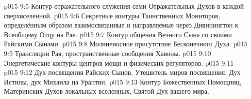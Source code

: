 \vs p015 9:5 Контур отражательного служения семи Отражательных Духов в каждой сверхвселенной.
\vs p015 9:6 Секретные контуры Таинственных Мониторов, определённым образом взаимосвязанные и направляемые через Дивинингтон к Всеобщему Отцу на Рае.
\vs p015 9:7 Контур общения Вечного Сына со своими Райскими Сынами.
\vs p015 9:8 Молниеносное присутствие Бесконечного Духа.
\vs p015 9:9 Трансляции Рая, пространственные сообщения Хавоны.
\vs p015 9:10 Энергетические контуры центров мощи и физических регуляторов.
\vs p015 9:11 \pc {}
\vs p015 9:12 Дух посвящения Райских Сынов, Утешитель миров посвящения. Дух Истины, дух Михаила на Урантии.
\vs p015 9:13 Контур Божественных Помощниц, Материнских Духов локальных вселенных, Святой Дух вашего мира.
